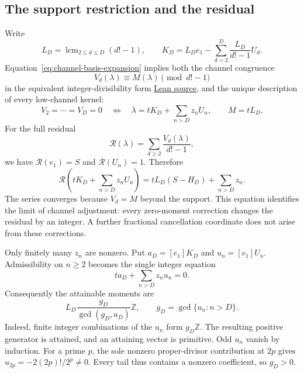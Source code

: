 \documentclass[11pt]{article}
\begin{document}
\subsection{The support restriction and the residual}
Write
\[
L_D=\operatorname{lcm}_{2\le d\le D}(d!-1),\qquad
K_D=L_De_1-\sum_{d=2}^D\frac{L_D}{d!-1}U_d.
\]
Equation~\eqref{eq:channel-basis-expansion} implies both the channel congruence
\begin{equation}
V_d(\lambda)\equiv M(\lambda)\pmod{d!-1}
\label{res:congruence}
\end{equation}
in the equivalent integer-divisibility form
\href{https://github.com/wcook04/plectis-erdos/blob/f36a98bf3d3e6f65f1074e3b800e3293d5b8a51a/ErdosProblems/Erdos68/PaperCompleteSupplementary.lean#L53}{Lean source},
and the unique description of every low-channel kernel:
\begin{equation}
V_2=\cdots=V_D=0
\quad\Longleftrightarrow\quad
\lambda=tK_D+\sum_{n>D}z_nU_n,\qquad M=tL_D.
\label{eq:low-channel-classification}
\end{equation}
For the full residual
\[
\mathcal R(\lambda)=\sum_{d\ge2}\frac{V_d(\lambda)}{d!-1},
\]
we have $\mathcal R(e_1)=S$ and $\mathcal R(U_n)=1$.  Therefore
\begin{equation}
\mathcal R\left(tK_D+\sum_{n>D}z_nU_n\right)
=tL_D(S-H_D)+\sum_{n>D}z_n.
\label{eq:residual-transparency}
\end{equation}
The series converges because $V_d=M$ beyond the support.  This equation
identifies the limit of channel adjustment: every zero-moment correction
changes the residual by an integer.  A further fractional cancellation
coordinate does not arise from these corrections.

Only finitely many $z_n$ are nonzero.  Put $a_D=[e_1]K_D$ and
$u_n=[e_1]U_n$.  Admissibility on $n\ge2$ becomes the single integer equation
\begin{equation}
t a_D+\sum_{n>D}z_nu_n=0.\label{eq:support-equation}
\end{equation}
Consequently the attainable moments are
\begin{equation}
L_D\frac{g_D}{\gcd(g_D,a_D)}\mathbb Z,
\qquad g_D=\gcd\{u_n:n>D\}.
\label{eq:attainable-moment-ideal}
\end{equation}
Indeed, finite integer combinations of the $u_n$ form $g_D\mathbb Z$.
The resulting positive generator is attained, and an attaining vector is
primitive.  Odd $u_n$ vanish by induction.  For a prime $p$, the sole nonzero
proper-divisor contribution at $2p$ gives $u_{2p}=-2(2p)!/2^p\ne0$.
Every tail thus contains a nonzero coefficient, so $g_D>0$.
\end{document}
